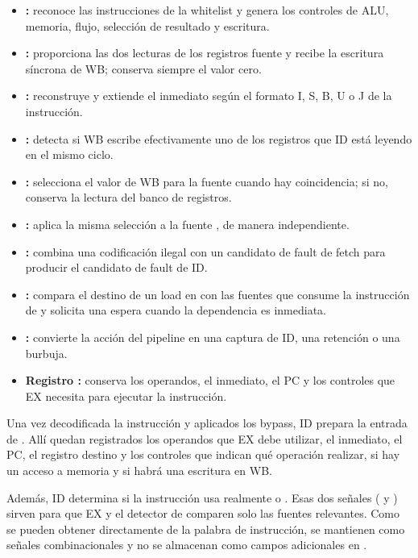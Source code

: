 \begin{itemize}
  \item \textbf{:} reconoce las instrucciones de la whitelist y
    genera los controles de ALU, memoria, flujo, selección de resultado y
    escritura.
  \item \textbf{:} proporciona las dos lecturas de los
    registros fuente y recibe la escritura síncrona de WB;  conserva
    siempre el valor cero.
  \item \textbf{:} reconstruye y extiende el
    inmediato según el formato I, S, B, U o J de la instrucción.
  \item \textbf{:} detecta si WB escribe efectivamente
    uno de los registros que ID está leyendo en el mismo ciclo.
  \item \textbf{:} selecciona el valor de WB para la
    fuente  cuando hay coincidencia; si no, conserva la lectura del
    banco de registros.
  \item \textbf{:} aplica la misma selección a la fuente
    , de manera independiente.
  \item \textbf{:} combina una codificación ilegal con un
    candidato de fault de fetch para producir el candidato de fault de ID.
  \item \textbf{:} compara el destino de un load en
     con las fuentes que consume la instrucción de  y
    solicita una espera cuando la dependencia es inmediata.
  \item \textbf{:} convierte la acción del pipeline
    en una captura de ID, una retención o una burbuja.
  \item \textbf{Registro :} conserva los operandos, el inmediato,
    el PC y los controles que EX necesita para ejecutar la instrucción.
\end{itemize}

Una vez decodificada la instrucción y aplicados los bypass, ID prepara la
entrada de . Allí quedan registrados los operandos que EX debe
utilizar, el inmediato, el PC, el registro destino y los controles que indican
qué operación realizar, si hay un acceso a memoria y si habrá una escritura en
WB.

Además, ID determina si la instrucción usa realmente  o .
Esas dos señales ( y ) sirven para que EX y el detector de
 comparen solo las fuentes relevantes. Como se pueden obtener
directamente de la palabra de instrucción, se mantienen como señales
combinacionales y no se almacenan como campos adicionales en .


